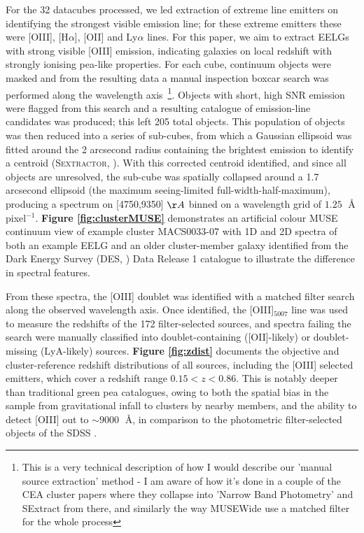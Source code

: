 \documentclass[fleqn,usenatbib]{mnras}
\begin{document}
For the 32 datacubes processed, we led extraction of extreme line emitters on identifying the strongest visible emission line; for these extreme emitters these were [OIII], [H$\alpha$], [OII] and Ly$\alpha$ lines. For this paper, we aim to extract EELGs with strong visible [OIII] emission, indicating galaxies on local redshift with strongly ionising pea-like properties. For each cube, continuum objects were masked and from the resulting data a manual inspection boxcar search was performed along the wavelength axis~\footnote{This is a very technical description of how I would describe our 'manual source extraction' method - I am aware of how it's done in a couple of the CEA cluster papers where they collapse into 'Narrow Band Photometry' and SExtract from there, and similarly the way MUSEWide use a matched filter for the whole process}. Objects with short, high SNR emission were flagged from this search and a resulting catalogue of emission-line candidates was produced; this left 205 total objects. This population of objects was then reduced into a series of sub-cubes, from which a Gaussian ellipsoid was fitted around the 2 arcsecond radius containing the brightest emission to identify a centroid (\textsc{Sextractor}, \cite{bertin1996}). With this corrected centroid identified, and since all objects are unresolved, the sub-cube was spatially collapsed around a 1.7 arcsecond ellipsoid (the maximum seeing-limited full-width-half-maximum), producing a spectrum on  [4750,9350] $\AA$ binned on a wavelength grid of $1.25\;$ \AA$\;$pixel$^{-1}$. \textbf{Figure \ref{fig:clusterMUSE}} demonstrates an artificial colour MUSE continuum view of example cluster MACS0033-07 with 1D and 2D spectra of both an example EELG and an older cluster-member galaxy identified from the Dark Energy Survey (DES, \cite{desdr1}) Data Release 1 catalogue to illustrate the difference in spectral features.

From these spectra, the [OIII] doublet was identified with a matched filter search along the observed wavelength axis. Once identified, the [OIII]$_{5007}$ line was used to measure the redshifts of the 172 filter-selected sources, and spectra failing the search were manually classified into doublet-containing ([OII]-likely) or doublet-missing (LyA-likely) sources. \textbf{Figure \ref{fig:zdist}} documents the objective and cluster-reference redshift distributions of all sources, including the [OIII] selected emitters, which cover a redshift range $0.15<z<0.86$. This is notably deeper than traditional green pea catalogues, owing to both the spatial bias in the sample from gravitational infall to clusters by nearby members, and the ability to detect [OIII] out to $\sim9000\;$ \AA, in comparison to the photometric filter-selected objects of the SDSS \cite{cardamone, jiang, yang_2016, samonski2025}. 
\end{document}
